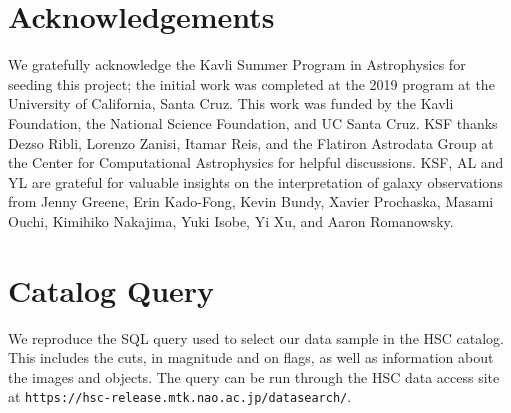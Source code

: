 \documentclass[fleqn,usenatbib,useAMS]{mnras}
\begin{document}
\section*{Acknowledgements}

We gratefully acknowledge the Kavli Summer Program in Astrophysics for seeding this project; the initial work was completed at the 2019 program at the University of California, Santa Cruz.
This work was funded by the Kavli Foundation, the National Science Foundation, and UC Santa Cruz.
KSF thanks Dezso Ribli, Lorenzo Zanisi, Itamar Reis, and the Flatiron Astrodata Group at the Center for Computational Astrophysics for helpful discussions.
KSF, AL and YL are grateful for valuable insights on the interpretation of galaxy observations from Jenny Greene, Erin Kado-Fong, Kevin Bundy, Xavier Prochaska, Masami Ouchi, Kimihiko Nakajima, Yuki Isobe, Yi Xu, and Aaron Romanowsky.





\appendix
\section{Catalog Query}
\label{sec:query}

We reproduce the SQL query used to select our data sample in the HSC catalog.
This includes the cuts, in magnitude and on flags, as well as information about the images and objects.
The query can be run through the HSC data access site at \texttt{https://hsc-release.mtk.nao.ac.jp/datasearch/}.
\end{document}
